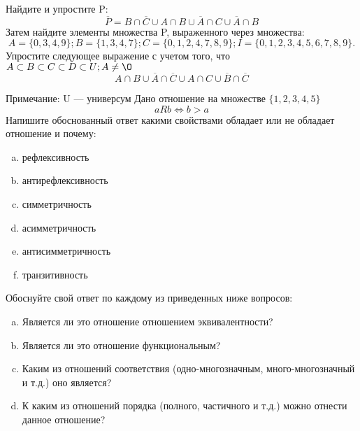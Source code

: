 \documentclass[10pt]{exam}
\begin{document}
\begin{questions}
\question
Найдите и упростите P:
\begin{equation*}
\overline{P} = B \cap \overline{C} \cup A \cap B \cup \overline{A} \cap C \cup \overline{A} \cap B
\end{equation*}
Затем найдите элементы множества P, выраженного через множества:
\begin{equation*}
A = \{0, 3, 4, 9\}; 
B = \{1, 3, 4, 7\};
C = \{0, 1, 2, 4, 7, 8, 9\};
I = \{0, 1, 2, 3, 4, 5, 6, 7, 8, 9\}.
\end{equation*}\question
Упростите следующее выражение с учетом того, что $A\subset B \subset C \subset D \subset U; A \neq \O$
\begin{equation*}
A \cap B \cup \overline{A} \cap \overline{C} \cup A \cap C \cup \overline{B} \cap \overline{C}
\end{equation*}

Примечание: U — универсум\question
Дано отношение на множестве $\{1, 2, 3, 4, 5\}$ 
\begin{equation*}
aRb \iff b > a
\end{equation*}
Напишите обоснованный ответ какими свойствами обладает или не обладает отношение и почему:   
\begin{enumerate} [a)]\setcounter{enumi}{0}
\item рефлексивность
\item антирефлексивность
\item симметричность
\item асимметричность
\item антисимметричность
\item транзитивность
\end{enumerate}

Обоснуйте свой ответ по каждому из приведенных ниже вопросов:
\begin{enumerate} [a)]\setcounter{enumi}{0}
    \item Является ли это отношение отношением эквивалентности?
    \item Является ли это отношение функциональным?
    \item Каким из отношений соответствия (одно-многозначным, много-многозначный и т.д.) оно является?
    \item К каким из отношений порядка (полного, частичного и т.д.) можно отнести данное отношение?
\end{enumerate}


\end{questions}
\end{document}
